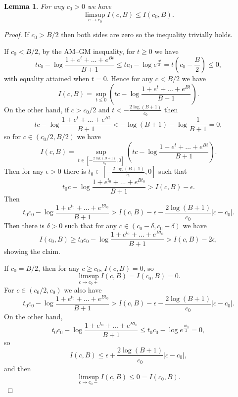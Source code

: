 \documentclass[12 pt]{article}
\newtheorem{lem}{Lemma}
\begin{document}
\begin{lem}\label{semicont}
For any $c_0 > 0$ we have
\[
\limsup_{c\to c_0} I(c, B) \le I(c_0, B).
\]
\end{lem}
\begin{proof}
If $c_0 > B/2$ then both sides are zero so the inequality trivially holds.

If $c_0 < B/2$, by the AM--GM inequality, for $t \ge 0$ we have
\[
tc_0 - \log \frac{1 + e^t + \dots + e^{Bt}}{B + 1}
\le tc_0 - \log e^{\frac{Bt}2} = t\left( c_0 - \frac B2 \right) \le 0,
\]
with equality attained when $t = 0$. Hence for any $c < B/2$ we have
\[
I(c, B) = \sup_{t\le0} \left( tc - \log \frac{1 + e^t + \dots + e^{Bt}}{B + 1} \right).
\]
On the other hand, if $c > c_0/2$ and $t < -\frac{2\log(B + 1)}{c_0}$ then
\[
tc - \log \frac{1 + e^t + \dots + e^{Bt}}{B + 1}
< -\log(B + 1) - \log\frac1{B + 1} = 0,
\]
so for $c \in (c_0/2, B/2)$ we have
\[
I(c, B) = \sup_{t\in\left[-\frac{2\log(B + 1)}{c_0},0\right]} \left( tc - \log \frac{1 + e^t + \dots + e^{Bt}}{B + 1} \right).
\]
Then for any $\epsilon > 0$ there is $t_0\in\left[-\frac{2\log(B + 1)}{c_0},0\right]$ such that
\[
t_0c - \log \frac{1 + e^{t_0} + \dots + e^{Bt_0}}{B + 1} > I(c, B) - \epsilon.
\]
Then
\[
t_0c_0 - \log \frac{1 + e^{t_0} + \dots + e^{Bt_0}}{B + 1} > I(c, B) - \epsilon - \frac{2\log(B + 1)}{c_0}|c - c_0|.
\]
Then there is $\delta > 0$ such that for any $c \in (c_0 - \delta, c_0 + \delta)$ we have
\[
I(c_0, B) \ge t_0c_0 - \log \frac{1 + e^{t_0} + \dots + e^{Bt_0}}{B + 1} > I(c, B) - 2\epsilon,
\]
showing the claim.

If $c_0 = B/2$, then for any $c \ge c_0$, $I(c, B) = 0$, so
\[
\limsup_{c\to c_0+} I(c, B) = I(c_0, B) = 0.
\]
For $c \in (c_0/2, c_0)$ we also have
\[
t_0c_0 - \log \frac{1 + e^{t_0} + \dots + e^{Bt_0}}{B + 1} > I(c, B) - \epsilon - \frac{2\log(B + 1)}{c_0}|c - c_0|.
\]
On the other hand,
\[
t_0c_0 - \log \frac{1 + e^{t_0} + \dots + e^{Bt_0}}{B + 1} \le t_0c_0 - \log e^{\frac{Bt_0}2} = 0,
\]
so
\[
I(c, B) \le \epsilon + \frac{2\log(B + 1)}{c_0}|c - c_0|,
\]
and then
\[
\limsup_{c\to c_0-} I(c, B) \le 0 = I(c_0, B).
\]
\end{proof}
\end{document}
